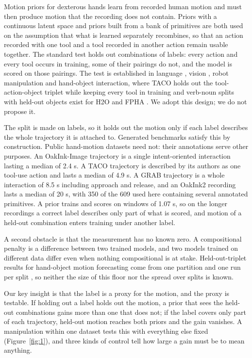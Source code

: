 \documentclass[10pt]{article}
\begin{document}
Motion priors for dexterous hands learn from recorded human motion and must then produce motion that the recording does not contain. Priors with a continuous latent space \citep{yang2026lamp} and priors built from a bank of primitives are both used on the assumption that what is learned separately recombines, so that an action recorded with one tool and a tool recorded in another action remain usable together. The standard test holds out combinations of labels: every action and every tool occurs in training, some of their pairings do not, and the model is scored on those pairings. The test is established in language \citep{lake2018generalization,keysers2020measuring}, vision \citep{materzynska2020something,atzmon2020causal}, robot manipulation \citep{gao2024efficient,chen2025robohiman,wang2026diagnosing} and hand-object interaction, where TACO holds out the tool-action-object triplet while keeping every tool in training \citep{liu2024taco} and verb-noun splits with held-out objects exist for H2O and FPHA \citep{tse2025collaborative}. We adopt this design; we do not propose it.

The split is made on labels, so it holds out the motion only if each label describes the whole trajectory it is attached to. Generated benchmarks satisfy this by construction. Public hand-motion datasets need not: their annotations serve other purposes. An OakInk-Image trajectory is a single intent-oriented interaction lasting a median of 2.4 s. A TACO trajectory is described by its authors as one tool-use action and lasts a median of 4.9 s. A GRAB trajectory is a whole interaction of 8.5 s including approach and release, and an OakInk2 recording lasts a median of 20 s, with 350 of the 609 used here containing several annotated primitives. A prior trains and scores on windows of 1.07 s, so on the longer recordings a correct label describes only part of what is scored, and motion of a held-out combination enters training under another label.

A second obstacle is that the measurement has no known zero. A compositional penalty is a difference between two trained models, and two models trained on different data differ even when nothing compositional is at stake. Held-out-triplet results for hand-object motion forecasting come from one partition and one run per split \citep{liu2024taco}, so neither the size of this floor nor the spread over splits is known.

Our key insight is that the label is a proxy for the motion, and the proxy is testable. If holding out a label holds out the motion, a prior that sees the held-out combinations gains more than one that does not; if the label covers only part of each trajectory, held-out motion reaches both priors and the gain vanishes. A manipulation within one dataset tests this with everything else fixed (Figure~\ref{fig:1}), and three kinds of control tell how large a gain must be to mean anything.
\end{document}
